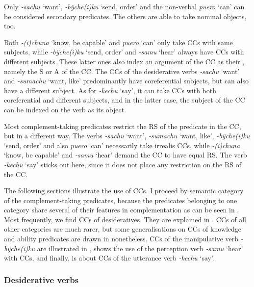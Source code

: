 Only \textit{-sachu} ‘want’, \textit{-bÿche(i)ku} ‘send, order’ and the non-verbal \textit{puero} ‘can’ can be considered secondary predicates. The others are able to take nominal objects, too. 

Both \textit{-(i)chuna} ‘know, be capable’ and \textit{puero} ‘can’ only take CCs with same subjects, while \textit{-bÿche(i)ku} ‘send, order’ and \textit{-samu} ‘hear’ always have CCs with different subjects. These latter ones also index an argument of the CC as their , namely the S or A of the CC. The CCs of the desiderative verbs \textit{-sachu} ‘want’ and \textit{-sumachu} ‘want, like’ predominantly have coreferential subjects, but can also have a different subject. As for \textit{-kechu} ‘say’, it can take CCs with both coreferential and different subjects, and in the latter case, the subject of the CC can be indexed on the verb as its object.

Most complement-taking predicates restrict the RS of the predicate in the CC, but in a different way. The verbs \textit{-sachu} ‘want’, \textit{-sumachu} ‘want, like’, \textit{-bÿche(i)ku} ‘send, order’ and also \textit{puero} ‘can’ necessarily take irrealis CCs, while \textit{-(i)chuna} ‘know, be capable’ and \textit{-samu} ‘hear’ demand the CC to have equal RS. The verb \textit{-kechu} ‘say’ sticks out here, since it does not place any restriction on the RS of the CC.

The following sections illustrate the use of CCs. I proceed by semantic category of the complement-taking predicates, because the predicates belonging to one category share several of their features in complementation as can be seen in . Most frequently, we find CCs of desideratives. They are explained in . CCs of all other categories are much rarer, but some generalisations on CCs of knowledge and ability predicates are drawn in  nonetheless. CCs of the manipulative verb \textit{-bÿche(i)ku} are illustrated in ,  shows the use of the perception verb \textit{-samu} ‘hear’ with CCs, and finally,  is about CCs of the utterance verb \textit{-kechu} ‘say’.


\subsubsection{Desiderative verbs}\label{sec:CC_Desideratives}

